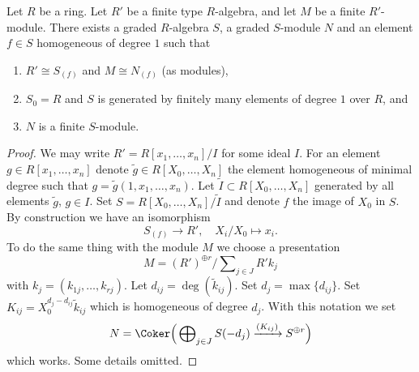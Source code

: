 \begin{lemma}
\label{lemma-homogenize}
Let $R$ be a ring.
Let $R'$ be a finite type $R$-algebra, and let $M$ be a finite $R'$-module.
There exists a graded $R$-algebra $S$, a graded $S$-module $N$ and
an element $f \in S$ homogeneous of degree $1$ such that
\begin{enumerate}
\item $R' \cong S_{(f)}$ and $M \cong N_{(f)}$ (as modules),
\item $S_0 = R$ and $S$ is generated by finitely many elements
of degree $1$ over $R$, and
\item $N$ is a finite $S$-module.
\end{enumerate}
\end{lemma}

\begin{proof}
We may write $R' = R[x_1, \ldots, x_n]/I$ for some ideal $I$.
For an element $g \in R[x_1, \ldots, x_n]$ denote
$\tilde g \in R[X_0, \ldots, X_n]$ the element homogeneous of minimal
degree such that $g = \tilde g(1, x_1, \ldots, x_n)$.
Let $\tilde I \subset R[X_0, \ldots, X_n]$ generated by all
elements $\tilde g$, $g \in I$.
Set $S = R[X_0, \ldots, X_n]/\tilde I$ and denote $f$ the image
of $X_0$ in $S$. By construction we have an isomorphism
$$
S_{(f)} \longrightarrow R', \quad
X_i/X_0 \longmapsto x_i.
$$
To do the same thing with the module $M$ we choose a presentation
$$
M = (R')^{\oplus r}/\sum\nolimits_{j \in J} R'k_j
$$
with $k_j = (k_{1j}, \ldots, k_{rj})$. Let $d_{ij} = \deg(\tilde k_{ij})$.
Set $d_j = \max\{d_{ij}\}$. Set $K_{ij} = X_0^{d_j - d_{ij}}\tilde k_{ij}$
which is homogeneous of degree $d_j$. With this notation we set
$$
N = \Coker\Big(
\bigoplus\nolimits_{j \in J} S(-d_j) \xrightarrow{(K_{ij})} S^{\oplus r}
\Big)
$$
which works. Some details omitted.
\end{proof}




